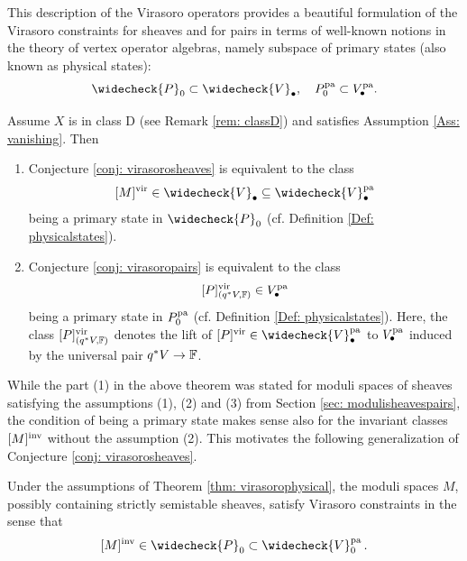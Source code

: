 \documentclass[a4paper, 12pt]{amsart}
\begin{document}
This description of the Virasoro operators provides a beautiful formulation of the Virasoro constraints for sheaves and for pairs in terms of well-known notions in the theory of vertex operator algebras, namely subspace of primary states (also known as physical states):
$$\widecheck{P}_0\subset \widecheck{V}_\bullet,\quad P_0^{\pa} \subset V_\bullet^{\pa}.$$

\begin{theorem}\label{thm: virasorophysical}
Assume $X$ is in class D (see Remark \ref{rem: classD}) and satisfies Assumption \ref{Ass: vanishing}. Then 
\begin{enumerate}
\item Conjecture \ref{conj: virasorosheaves} is equivalent to the class 
\[
[M]^\vir\in \widecheck{V}_\bullet \subseteq \widecheck{V}^{\pa}_\bullet
\]
being a primary state in $\widecheck{P}_0$ (cf. Definition \ref{Def: physicalstates}). 
\item Conjecture \ref{conj: virasoropairs} is equivalent to the class 
\[
[P]_{(q^\ast V,{\mathbb{F}})}^{\mathrm{vir}}\in V^{\mathop{\rm pa}\nolimits}_\bullet
\]
being a primary state in $P_0^{\mathop{\rm pa}\nolimits}$ 
(cf. Definition \ref{Def: physicalstates}). Here, the class $[P]_{{(q^\ast V,{\mathbb{F}})}}^{\mathrm{vir}}$ denotes the lift of $[P]^\vir\in \widecheck{V}^{\pa}_\bullet$ to $V^{\mathop{\rm pa}\nolimits}_\bullet$ induced by the universal pair $q^\ast V\to{\mathbb{F}}$.
\end{enumerate}
\end{theorem}
While the part (1) in the above theorem was stated for moduli spaces of sheaves satisfying the assumptions (1), (2) and (3) from Section \ref{sec: modulisheavespairs}, the condition of being a primary state makes sense also for the invariant classes $[M]^{\mathrm{inv}}$ without the assumption (2). This motivates the following generalization of Conjecture \ref{conj: virasorosheaves}. 
\begin{conjecture}
    \label{conj:actualinvvir}Under the assumptions of Theorem \ref{thm: virasorophysical}, the moduli spaces $M$, possibly containing strictly semistable sheaves, satisfy Virasoro constraints in the sense that
  $$
  [M]^{\inva}\in \widecheck{P}_0\subset  \widecheck{V}^{\pa}_{0}\,.
  $$
\end{conjecture}
\end{document}
